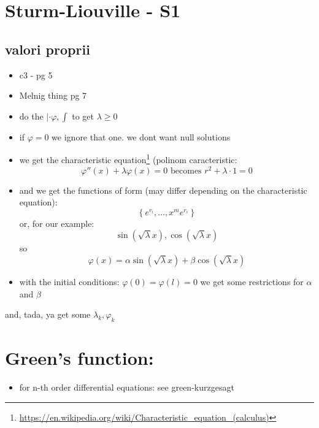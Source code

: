 \documentclass[11pt]{article}
\begin{document}
\section*{Sturm-Liouville - S1}
\label{sec:orgad2e22c}
\subsection*{valori proprii}
\label{sec:orgfd4732d}
\begin{itemize}
\item c3 - pg 5
\item Melnig thing pg 7

\item do the \(|\cdot \varphi, \int\) to get \(\lambda \geq 0\)
\item if \(\varphi = 0\) we ignore that one. we dont want null solutions
\end{itemize}

\begin{itemize}
 \item we get the characteristic 
 equation\footnote{\url{https://en.wikipedia.org/wiki/Characteristic_equation_(calculus)}} (polinom caracteristic:
  \[ \varphi''(x) + \lambda \varphi(x) =0  \text{ becomes } r^2 + \lambda\cdot 1 = 0 \]  
\end{itemize}
\begin{itemize}
\item and we get the functions of form (may differ depending on the characteristic equation):
\[\left \{ e^{r_i}, \ldots, x^m e^{r_i} \right\} \] 
or, for our example:
\[ \sin(\sqrt{\lambda} x), \cos(\sqrt{\lambda} x) \] 
so 
\[\varphi(x) = \alpha \sin(\sqrt{\lambda} x) + \beta \cos(\sqrt{\lambda} x) \]
\item with the initial conditions: \(\varphi(0) = \varphi(l) = 0\)
we get some restrictions for \(\alpha\) and \(\beta\)
\end{itemize}
and, tada, ya get some \(\lambda_k, \varphi_k\)

\section*{Green's function:}
\label{sec:orgdc69ea9}
\begin{itemize}
\item for n-th order differential equations:
see green-kurzgesagt
\end{itemize}
\end{document}
